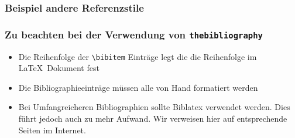 \begin{frame}[fragile,t]
\frametitle{Beispiel andere Referenzstile}
\end{frame}

\begin{frame}[fragile,t]
\frametitle{Zu beachten bei der Verwendung von \texttt{thebibliography}}
\begin{itemize}
\item Die Reihenfolge der \lstinline[style=Latex]+\bibitem+ Einträge legt die die Reihenfolge im LaTeX~Dokument fest
\item Die Bibliographieeinträge müssen alle von Hand formatiert werden
\item Bei Umfangreicheren Bibliographien sollte Biblatex verwendet werden. Dies führt jedoch auch zu mehr Aufwand. Wir verweisen hier auf entsprechende Seiten im Internet.
\end{itemize}
\end{frame}



